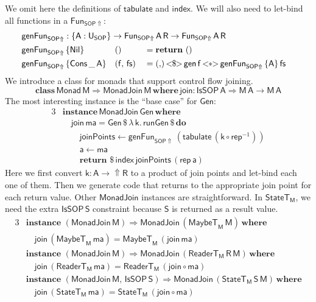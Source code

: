 \documentclass[acmsmall,screen,review,anonymous]{acmart}
\newcommand{\mit}[1]{{\mathsf{#1}}}
\newcommand{\msf}[1]{{\mathsf{#1}}}
\newcommand{\mbf}[1]{{\mathbf{#1}}}
\newcommand{\mdo}{\mbf{do}\,}
\newcommand{\ind}{\hspace{1em}}
\newcommand{\return}{\mbf{return}\,}
\newcommand{\lam}{\lambda\,}
\newcommand{\where}{\mbf{where}}
\newcommand{\M}{\msf{M}}
\newcommand{\vma}{\mathsf{ma}}
\newcommand{\vk}{\mathsf{k}}
\newcommand{\vA}{\mathsf{A}}
\newcommand{\vS}{\mathsf{S}}
\newcommand{\vR}{\mathsf{R}}
\newcommand{\vM}{\mathsf{M}}
\newcommand{\va}{\mathsf{a}}
\newcommand{\vf}{\mathsf{f}}
\newcommand{\vfs}{\mathsf{fs}}
\newcommand{\SOP}{\msf{SOP}}
\newcommand{\USOP}{\msf{U}_{\msf{SOP}}}
\newcommand{\IsSOP}{\msf{IsSOP}}
\newcommand{\Nil}{\msf{Nil}}
\newcommand{\Cons}{\msf{Cons}}
\newcommand{\ReaderT}{\msf{ReaderT}}
\newcommand{\Monad}{\msf{Monad}}
\newcommand{\fro}{\leftarrow}
\newcommand{\Lift}{{\Uparrow}}
\newcommand{\MaybeT}{\msf{MaybeT}}
\theoremstyle{remark}
\newcommand{\tyclass}{\mbf{class}}
\newcommand{\instance}{\mbf{instance}\,}
\newcommand{\Gen}{\msf{Gen}}
\newcommand{\gen}{\mit{gen}}
\newcommand{\fmap}{<\!\!\$\!\!>}
\newcommand{\ap}{{<\!\!*\!\!>}}
\newcommand{\runGen}{\mit{runGen}}
\newcommand{\RA}{\Rightarrow}
\newcommand{\StateT}{\msf{StateT}}
\newcommand{\dlr}{\,\$\,}
\newcommand{\MonadJoin}{\msf{MonadJoin}}
\newcommand{\join}{\mit{join}}
\newcommand{\mindex}{\mit{index}}
\newcommand{\mtabulate}{\mit{tabulate}}
\begin{document}
We omit here the definitions of $\mtabulate$ and $\mindex$. We will also need to
let-bind all functions in a $\mit{Fun}_{\SOP\Lift}$:
\begin{alignat*}{3}
  & \mathrlap{\mit{genFun}_{\SOP\Lift} : \{\vA : \USOP\} \to \mit{Fun}_{\SOP\Lift}\,\vA\,\vR \to \mit{Fun}_{\SOP\Lift}\,\vA\,\vR}\\
  & \mit{genFun}_{\SOP\Lift}\,\{\Nil\}        && ()             &&= \return\,()\\
  & \mit{genFun}_{\SOP\Lift}\,\{\Cons\,\_\,\vA\}&& (\vf,\,\mit{\vfs}) &&= ({,})\,{\fmap}\,\gen\,\vf\,{\ap}\,\mit{genFun}_{\SOP\Lift}\,\{\vA\}\,\vfs
\end{alignat*}
We introduce a class for monads that support control flow joining.
\[ \tyclass\,\Monad\,\vM \RA \MonadJoin\,\vM\,\where\,\join : \IsSOP\,\vA \RA \vM\,\vA \to \vM\,\vA \]
The most interesting instance is the ``base case'' for $\Gen$:
\begin{alignat*}{3}
  &\instance \MonadJoin\,\Gen\,\where\\
  &\ind \join\,\vma = \Gen \dlr \lam \vk.\,\runGen \dlr \mdo\\
  &\ind \ind \mit{joinPoints} \fro \mit{genFun}_{\SOP\Lift}\,(\mtabulate\,(\vk \circ \mit{rep}^{-1}))\\
  &\ind \ind \va \fro \vma\\
  &\ind \ind \return \dlr \mindex\,\mit{joinPoints}\,(\mit{rep}\,\va)
\end{alignat*}
Here we first convert $\vk : \vA \to \Lift \vR$ to a product of join points and
let-bind each one of them. Then we generate code that returns to the appropriate
join point for each return value. Other $\MonadJoin$ instances are straightforward. In
$\StateT_\M$, we need the extra $\IsSOP\,\vS$ constraint because $\vS$ is returned
as a result value.
\begin{alignat*}{3}
  & \instance\,(\MonadJoin\,\vM) \RA \MonadJoin\,(\MaybeT_\M\,\vM)\,\where\\
  & \ind \join\,(\MaybeT_\M\,\vma) = \MaybeT_\M\,(\join\,\vma)\\
  & \instance\,(\MonadJoin\,\vM) \RA \MonadJoin\,(\ReaderT_\M\,\vR\,\vM)\,\where\\
  & \ind \join\,(\ReaderT_\M\,\vma) = \ReaderT_\M\,(\join \circ \vma)\\
  & \instance\,(\MonadJoin\,\vM,\,\IsSOP\,\vS) \RA \MonadJoin\,(\StateT_\M\,\vS\,\vM)\,\where\\
  & \ind \join\,(\StateT_\M\,\vma) = \StateT_\M\,(\join \circ \vma)
\end{alignat*}
\end{document}
